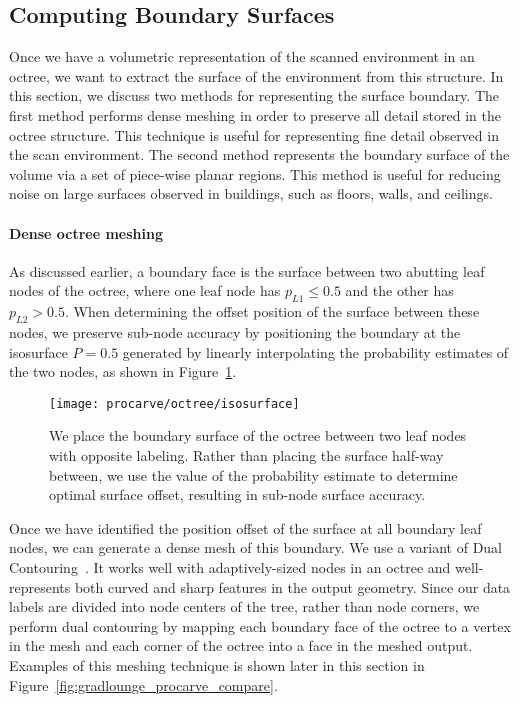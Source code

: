 \documentclass[12pt,onecolumn,oneside]{book}
\begin{document}
\subsection{Computing Boundary Surfaces}
\label{ssec:procarve_boundary}

Once we have a volumetric representation of the scanned environment in an octree, we want to extract the surface of the environment from this structure.  In this section, we discuss two methods for representing the surface boundary.  The first method performs dense meshing in order to preserve all detail stored in the octree structure.  This technique is useful for representing fine detail observed in the scan environment.  The second method represents the boundary surface of the volume via a set of piece-wise planar regions.  This method is useful for reducing noise on large surfaces observed in buildings, such as floors, walls, and ceilings.

\paragraph*{Dense octree meshing}
As discussed earlier, a boundary face is the surface between two abutting leaf nodes of the octree, where one leaf node has $p_{L1} \leq 0.5$ and the other has $p_{L2} > 0.5$.  When determining the offset position of the surface between these nodes, we preserve sub-node accuracy by positioning the boundary at the isosurface $P = 0.5$ generated by linearly interpolating the probability estimates of the two nodes, as shown in Figure~\ref{fig:octree_isosurface}.

\begin{figure}[h!]
	\centerline{\texttt{[image: procarve/octree/isosurface]}}
	\caption[Determining sub-node accuracy for boundary surface.]{We place the boundary surface of the octree between two leaf nodes with opposite labeling.  Rather than placing the surface half-way between, we use the value of the probability estimate to determine optimal surface offset, resulting in sub-node surface accuracy.}
	\label{fig:octree_isosurface}
\end{figure}

Once we have identified the position offset of the surface at all boundary leaf nodes, we can generate a dense mesh of this boundary.  We use a variant of Dual Contouring~\cite{DualContouring}.  It works well with adaptively-sized nodes in an octree and well-represents both curved and sharp features in the output geometry.  Since our data labels are divided into node centers of the tree, rather than node corners, we perform dual contouring by mapping each boundary face of the octree to a vertex in the mesh and each corner of the octree into a face in the meshed output.  Examples of this meshing technique is shown later in this section in Figure~\ref{fig:gradlounge_procarve_compare}.
\end{document}
